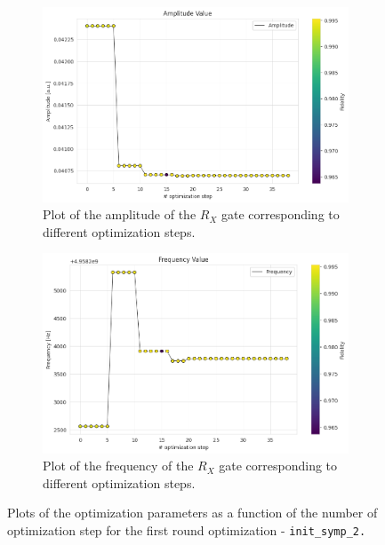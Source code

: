 \begin{figure}[htbp]
    \centering
    \begin{subfigure}[t]{0.45\textwidth}
        \includegraphics[width=\textwidth]{figures/png/RB_optimization/NM/InitialSymplex/20241110_211211/amplitude.png}
        \caption{Plot of the amplitude of the $R_X$ gate corresponding to different optimization steps.}
        \label{fig:20241110_211211:amplitude}
    \end{subfigure}
    \hfill
    \begin{subfigure}[t]{0.45\textwidth}
        \includegraphics[width=\textwidth]{figures/png/RB_optimization/NM/InitialSymplex/20241110_211211/frequency.png}
        \caption{Plot of the frequency of the $R_X$ gate corresponding to different optimization steps.}
        \label{fig:20241110_211211:frequency}
    \end{subfigure}
    \caption{Plots of the optimization parameters as a function of the number of optimization step for the first round optimization - \tt{init\_symp\_2}.}
    \label{fig:20241110_211211:parameters}
\end{figure}

